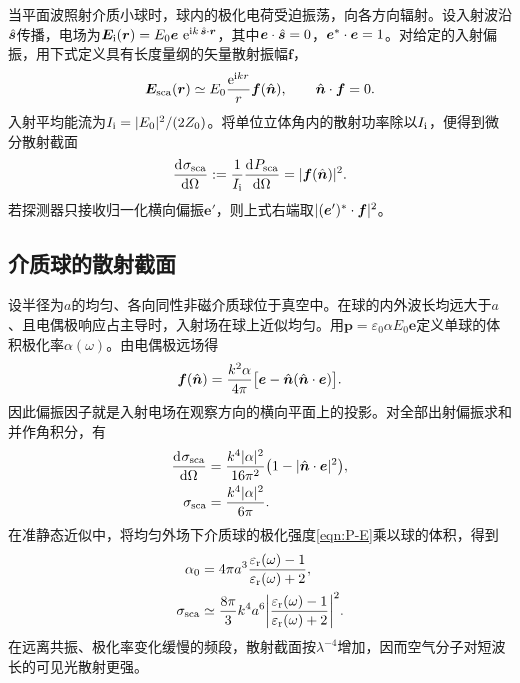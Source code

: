 当平面波照射介质小球时，球内的极化电荷受迫振荡，向各方向辐射。设入射波沿$\mathop{}\!\hat{\bm{s}}$传播，电场为$\bm E_\mathrm i(\bm r) = E_0\bm e\,\mathop{}\!\mathrm{e}^{\mathrm{i} k\mathop{}\!\hat{\bm{s}}\cdot\bm r}$，其中$\bm e \cdot \mathop{}\!\hat{\bm{s}} = 0$，$\bm e^\ast \cdot \bm e = 1$。对给定的入射偏振，用下式定义具有长度量纲的矢量散射振幅$\bm f$，
\begin{equation}
    \label{eq:ed-far-field-scattering-amplitude}
    \bm E_\mathrm{sca}(\bm r) \simeq E_0\frac{\mathop{}\!\mathrm{e}^{\mathrm{i} kr}}r\bm f(\mathop{}\!\hat{\bm{n}}),
    \qquad \mathop{}\!\hat{\bm{n}} \cdot \bm f = 0.
\end{equation}
入射平均能流为$I_\mathrm i = \lvert E_0\rvert^2/(2Z_0)$。将单位立体角内的散射功率除以$I_\mathrm i$，便得到微分散射截面
\begin{equation}
    \label{eq:ed-differential-cross-section}
    \frac{\mathop{}\!\mathrm{d}^{}\sigma_\mathrm{sca}}{\mathrm{d}{\Omega}^{}}
    := \frac1{I_\mathrm i}\frac{\mathop{}\!\mathrm{d}^{}P_\mathrm{sca}}{\mathrm{d}{\Omega}^{}} = \lvert\bm f(\mathop{}\!\hat{\bm{n}})\rvert^2.
\end{equation}
若探测器只接收归一化横向偏振$\bm e'$，则上式右端取$\lvert(\bm e')^\ast \cdot \bm f\rvert^2$。

\subsection{介质球的散射截面}

设半径为$a$的均匀、各向同性非磁介质球位于真空中。在球的内外波长均远大于$a$、且电偶极响应占主导时，入射场在球上近似均匀。用$\bm p = \varepsilon_0\alpha E_0\bm e$定义单球的体积极化率$\alpha(\omega)$。由电偶极远场得
\begin{equation}
    \bm f(\mathop{}\!\hat{\bm{n}}) = \frac{k^2\alpha}{4\pi}
       \bigl[\bm e - \mathop{}\!\hat{\bm{n}}(\mathop{}\!\hat{\bm{n}} \cdot \bm e)\bigr].
    \label{eqn:dipole scattering amplitude}
\end{equation}
因此偏振因子就是入射电场在观察方向的横向平面上的投影。对全部出射偏振求和并作角积分，有
\begin{subequations}
    \begin{align}
        \frac{\mathop{}\!\mathrm{d}^{}\sigma_\mathrm{sca}}{\mathrm{d}{\Omega}^{}}
          &= \frac{k^4\lvert\alpha\rvert^2}{16\pi^2}
             \bigl(1 - \lvert\mathop{}\!\hat{\bm{n}} \cdot \bm e\rvert^2\bigr),\\
        \sigma_\mathrm{sca} &= \frac{k^4\lvert\alpha\rvert^2}{6\pi}. \label{eqn:Rayleigh cross section}
    \end{align}
\end{subequations}
在准静态近似中，将均匀外场下介质球的极化强度\eqref{eqn:P-E}乘以球的体积，得到
\begin{align*}
    \alpha_0 &= 4\pi a^3\frac{\varepsilon_\mathrm r(\omega) - 1}{\varepsilon_\mathrm r(\omega) + 2},\\
    \sigma_\mathrm{sca} &\simeq \frac{8\pi}3 k^4a^6
        \biggl\lvert\frac{\varepsilon_\mathrm r(\omega) - 1}{\varepsilon_\mathrm r(\omega) + 2}\biggr\rvert^2 .
\end{align*}
在远离共振、极化率变化缓慢的频段，散射截面按$\lambda^{-4}$增加，因而空气分子对短波长的可见光散射更强。

